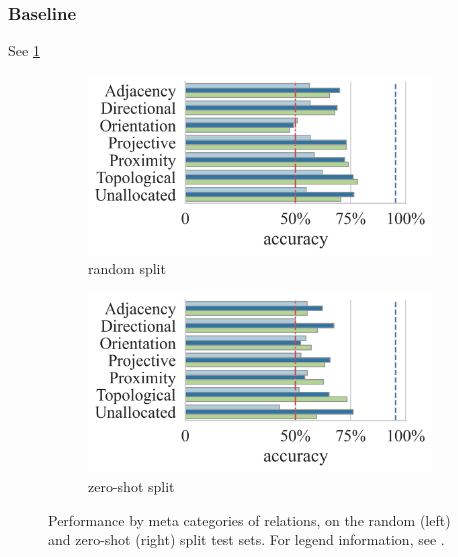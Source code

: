 \subsubsection{Baseline}

See \cref{fig:performance_by_meta_cat_base}

\begin{figure}
    \centering
\begin{subfigure}[b]{0.49\linewidth}
    \centering
    \includegraphics[width=\linewidth]{images/visual-spatial-reasoning/performance_by_meta_cat_random_split_v2.png}
    \caption{random split}
\end{subfigure}
\begin{subfigure}[b]{0.49\linewidth}
    \centering
    \includegraphics[width=\linewidth]{images/visual-spatial-reasoning/performance_by_meta_cat_zeroshot_split_v2.png}
    \caption{zero-shot split}
\end{subfigure}
\caption{Performance by meta categories of relations, on the random (left) and zero-shot (right) split test sets. For legend information, see .}
    \label{fig:performance_by_meta_cat_base}
\end{figure}


